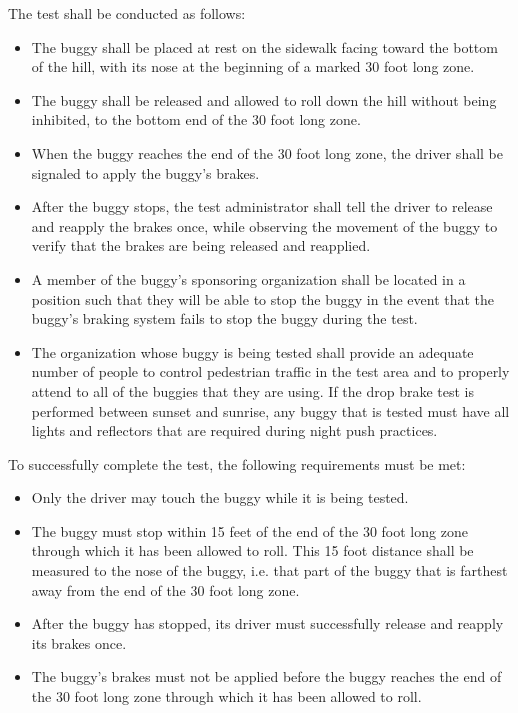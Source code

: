 The test shall be conducted as follows:
\begin{itemize}
	\item The buggy shall be placed at rest on the sidewalk facing toward the bottom of the hill, with its nose at the beginning of a marked 30 foot long zone.

	\item The buggy shall be released and allowed to roll down the hill without being inhibited, to the bottom end of the 30 foot long zone.
 
	\item When the buggy reaches the end of the 30 foot long zone, the driver shall be signaled to apply the buggy's brakes.
 
	\item After the buggy stops, the test administrator shall tell the driver to release and reapply the brakes once, while observing the movement of the buggy to verify that the brakes are being released and reapplied.
 
	\item A member of the buggy's sponsoring organization shall be located in a position such that they will be able to stop the buggy in the event that the buggy's braking system fails to stop the buggy during the test.
 
	\item The organization whose buggy is being tested shall provide an adequate number of people to control pedestrian traffic in the test area and to properly attend to all of the buggies that they are using. If the drop brake test is performed between sunset and sunrise, any buggy that is tested must have all lights and reflectors that are required during night push practices.
\end{itemize}

To successfully complete the test, the following requirements must be met:
\begin{itemize}
	\item Only the driver may touch the buggy while it is being tested.
 
	\item The buggy must stop within 15 feet of the end of the 30 foot long zone through which it has been allowed to roll. This 15 foot distance shall be measured to the nose of the buggy, i.e. that part of the buggy that is farthest away from the end of the 30 foot long zone.
 
	\item After the buggy has stopped, its driver must successfully release and reapply its brakes once.
 
	\item The buggy's brakes must not be applied before the buggy reaches the end of the 30 foot long zone through which it has been allowed to roll.
\end{itemize}

